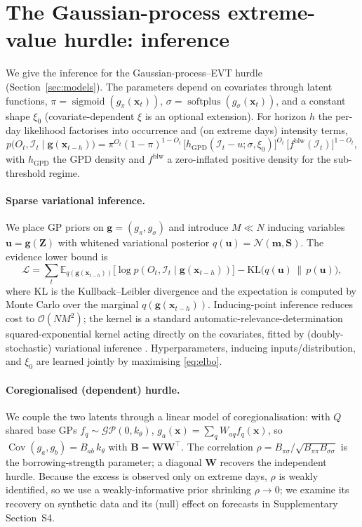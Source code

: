 \documentclass[11pt,a4paper]{article}
\newcommand{\Ind}{\mathcal{I}}                 %
\newcommand{\GP}{\mathcal{GP}}
\newcommand{\E}{\mathbb{E}}
\newcommand{\Normal}{\mathcal{N}}
\newcommand{\GPD}{\mathrm{GPD}}
\newcommand{\sigmoid}{\operatorname{sigmoid}}
\newcommand{\softplus}{\operatorname{softplus}}
\newcommand{\KL}{\mathrm{KL}}
\newcommand{\bx}{\bm{x}}
\newcommand{\bg}{\bm{g}}
\newcommand{\bB}{\bm{B}}
\newcommand{\bu}{\bm{u}}
\newcommand{\bZ}{\bm{Z}}
\begin{document}
\section{The Gaussian-process extreme-value hurdle: inference}\label{app:inference}

We give the inference for the Gaussian-process--EVT hurdle
(Section~\ref{sec:models}).
The parameters depend on covariates through latent functions,
$\pi=\sigmoid(g_\pi(\bx_t))$, $\sigma=\softplus(g_\sigma(\bx_t))$, and a constant
shape $\xi_0$ (covariate-dependent $\xi$ is an optional extension). For horizon
$h$ the per-day likelihood factorises into occurrence and (on extreme days)
intensity terms,
\begin{equation}\label{eq:like}
p\big(O_t,\Ind_t\mid \bg(\bx_{t-h})\big)
= \pi^{O_t}(1-\pi)^{1-O_t}\,\big[h_{\GPD}(\Ind_t-u;\sigma,\xi_0)\big]^{O_t}
\,\big[f^{\mathrm{blw}}(\Ind_t)\big]^{1-O_t},
\end{equation}
with $h_{\GPD}$ the GPD density and $f^{\mathrm{blw}}$ a zero-inflated positive
density for the sub-threshold regime.

\paragraph{Sparse variational inference.} We place GP priors on
$\bg=(g_\pi,g_\sigma)$ and introduce $M\ll N$ inducing variables $\bu=\bg(\bZ)$
with whitened variational posterior $q(\bu)=\Normal(\bm m,\bm S)$. The evidence
lower bound is
\begin{equation}\label{eq:elbo}
\mathcal{L} = \sum_t \E_{q(\bg(\bx_{t-h}))}\!\big[\log p(O_t,\Ind_t\mid\bg(\bx_{t-h}))\big]
- \KL\!\big(q(\bu)\,\|\,p(\bu)\big),
\end{equation}
where $\KL$ is the Kullback--Leibler divergence and the expectation is
computed by Monte Carlo over the marginal $q(\bg(\bx_{t-h}))$.
Inducing-point inference reduces cost to $\mathcal{O}(NM^2)$; the kernel is a
standard automatic-relevance-determination squared-exponential kernel acting
directly on the covariates, fitted by (doubly-stochastic) variational inference
\citep{salimbeni2017doubly}.
Hyperparameters, inducing inputs/distribution, and $\xi_0$ are
learned jointly by maximising \eqref{eq:elbo}.

\paragraph{Coregionalised (dependent) hurdle.} We couple the two latents through a
linear model of coregionalisation: with $Q$ shared base GPs $f_q\sim\GP(0,k_\theta)$,
$g_a(\bx)=\sum_{q} W_{aq} f_q(\bx)$, so $\operatorname{Cov}(g_a,g_b)=B_{ab}\,k_\theta$
with $\bB=\bm W\bm W^\top$. The correlation
$\rho=B_{\pi\sigma}/\sqrt{B_{\pi\pi}B_{\sigma\sigma}}$ is the borrowing-strength
parameter; a diagonal $\bm W$ recovers the independent hurdle. Because the excess
is observed only on extreme days, $\rho$ is weakly identified, so we use a
weakly-informative prior shrinking $\rho\to0$; we examine its recovery on
synthetic data and its (null) effect on forecasts in Supplementary Section~S4.
\end{document}
